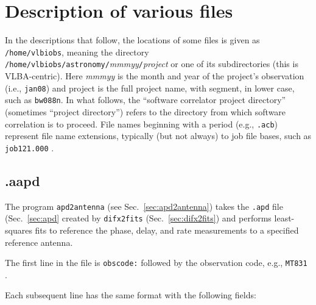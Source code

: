 

\section{Description of various files} \label{sec:files}

In the descriptions that follow, the locations of some files is given as {\tt /home/vlbiobs}, meaning the directory {\tt /home/vlbiobs/astronomy/}{\em mmmyy}{\tt /}{\em project} or one of its subdirectories (this is VLBA-centric).
Here {\em mmmyy} is the month and year of the project's observation (i.e., {\tt jan08}) and project is the full project name, with segment, in lower case, such as {\tt bw088n}.
In what follows, the ``software correlator project directory'' (sometimes ``project directory'') refers to the directory from which software correlation is to proceed.
File names beginning with a period (e.g., {\tt .acb}) represent file name extensions, typically (but not always) to job file bases, such as {\tt job121.000} .







\subsection{.aapd} \label{sec:aapd}

The program {\tt apd2antenna} (see Sec.~\ref{sec:apd2antenna}) takes the {\tt .apd} file (Sec.~\ref{sec:apd} created by {\tt difx2fits} (Sec.~\ref{sec:difx2fits}) and performs least-squares fits to reference the phase, delay, and rate measurements to a specified reference antenna.

The first line in the file is {\tt obscode:} followed by the observation code, e.g., {\tt MT831} .

Each subsequent line has the same format with the following fields:


